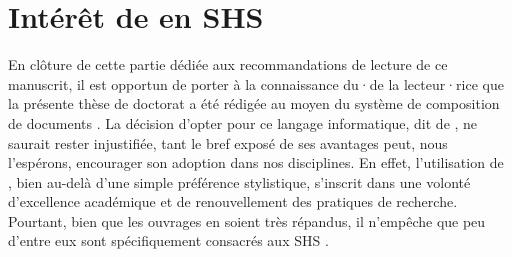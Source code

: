 \section*{Intérêt de \latexword{\LaTeX} en \acrlong{SHS}
    \label{subbody:interet-latex}
    }

En clôture de cette partie dédiée aux recommandations de lecture de ce manuscrit, il est opportun de porter à la connaissance du·de la lecteur·rice que la présente thèse de doctorat a été rédigée au moyen du système de composition de documents \latexword{\LaTeX}. La décision d'opter pour ce langage informatique, dit de  \textcolor{blue}{\autocite[16]{pochet_markdown_2023}}, ne saurait rester injustifiée, tant le bref exposé de ses avantages peut, nous l'espérons, encourager son adoption dans nos disciplines. En effet, l'utilisation de \latexword{\LaTeX}, bien au-delà d'une simple préférence stylistique, s'inscrit dans une volonté d'excellence académique et de renouvellement des pratiques de recherche. Pourtant, bien que les ouvrages en \latexword{\LaTeX} soient très répandus, il n'empêche que peu d'entre eux sont spécifiquement consacrés aux \acrshort{SHS} \textcolor{blue}{\autocite[7]{rouquette_xelatex_2012}}.%

